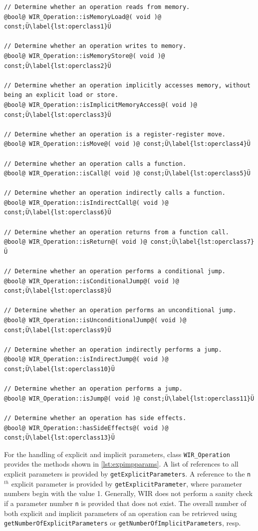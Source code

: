 \begin{lstlisting}[style=code,float=!b,caption={Operation Classification},label=lst:operclass]
// Determine whether an operation reads from memory.
@bool@ WIR_Operation::isMemoryLoad@( void )@ const;Ü\label{lst:operclass1}Ü

// Determine whether an operation writes to memory.
@bool@ WIR_Operation::isMemoryStore@( void )@ const;Ü\label{lst:operclass2}Ü

// Determine whether an operation implicitly accesses memory, without being an explicit load or store.
@bool@ WIR_Operation::isImplicitMemoryAccess@( void )@ const;Ü\label{lst:operclass3}Ü

// Determine whether an operation is a register-register move.
@bool@ WIR_Operation::isMove@( void )@ const;Ü\label{lst:operclass4}Ü

// Determine whether an operation calls a function.
@bool@ WIR_Operation::isCall@( void )@ const;Ü\label{lst:operclass5}Ü

// Determine whether an operation indirectly calls a function.
@bool@ WIR_Operation::isIndirectCall@( void )@ const;Ü\label{lst:operclass6}Ü

// Determine whether an operation returns from a function call.
@bool@ WIR_Operation::isReturn@( void )@ const;Ü\label{lst:operclass7}Ü

// Determine whether an operation performs a conditional jump.
@bool@ WIR_Operation::isConditionalJump@( void )@ const;Ü\label{lst:operclass8}Ü

// Determine whether an operation performs an unconditional jump.
@bool@ WIR_Operation::isUnconditionalJump@( void )@ const;Ü\label{lst:operclass9}Ü

// Determine whether an operation indirectly performs a jump.
@bool@ WIR_Operation::isIndirectJump@( void )@ const;Ü\label{lst:operclass10}Ü

// Determine whether an operation performs a jump.
@bool@ WIR_Operation::isJump@( void )@ const;Ü\label{lst:operclass11}Ü

// Determine whether an operation has side effects.
@bool@ WIR_Operation::hasSideEffects@( void )@ const;Ü\label{lst:operclass13}Ü
\end{lstlisting}

For the handling of explicit and implicit parameters, class \texttt{WIR\_Operation} provides the methods shown in \cref{lst:expimpparams}.
A list of references to all explicit parameters is provided by \texttt{getExplicitParameters}.
A reference to the \texttt{n}$^\mathit{th}$ explicit parameter is provided by \texttt{getExplicitParameter}, where parameter numbers begin with the value 1.
Generally, \gls{WIR} does not perform a sanity check if a parameter number \texttt{n} is provided that does not exist.
The overall number of both explicit and implicit parameters of an operation can be retrieved using \texttt{getNumberOfExplicitParameters} or \texttt{getNumberOfImplicitParameters}, resp.

